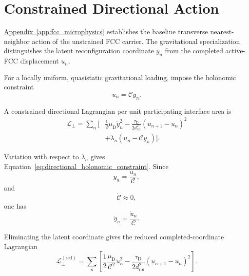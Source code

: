 \section{Constrained Directional Action}
\label{sec:grav_constrained_directional_action}

\hyperref[app:fcc_microphysics]{Appendix~\ref*{app:fcc_microphysics}} establishes the baseline transverse nearest-neighbor action of the unstrained FCC carrier. The gravitational specialization distinguishes the latent reconfiguration coordinate $y_{n}$ from the completed active-FCC displacement $u_{n}$.

For a locally uniform, quasistatic gravitational loading, impose the holonomic constraint
\begin{equation}
    u_{n} = \mathcal{C}y_{n}.
    \label{eq:directional_holonomic_constraint}
\end{equation}

A constrained directional Lagrangian per unit participating interface area is
\begin{equation}
\begin{aligned}
    \mathcal{L}_{\perp} = \sum_{n} \Bigg[ & \frac{1}{2}\mu_{\mathrm{D}}\dot{y}_{n}^2 - \frac{\tau_{\mathrm{D}}}{2d_{\mathrm{nn}}^2} \left( u_{n+1}-u_{n} \right)^2 \\
    & + \lambda_{n} \left( u_{n}-\mathcal{C}y_{n} \right) \Bigg].
    \label{eq:constrained_directional_lagrangian}
\end{aligned}
\end{equation}

Variation with respect to $\lambda_{n}$ gives Equation~\eqref{eq:directional_holonomic_constraint}. Since
\begin{equation}
    y_{n} = \frac{u_{n}}{\mathcal{C}},
\end{equation}
and
\begin{equation}
    \dot{\mathcal{C}} \approx 0,
\end{equation}
one has
\begin{equation}
    \dot{y}_{n} = \frac{\dot{u}_{n}}{\mathcal{C}}.
\end{equation}

Eliminating the latent coordinate gives the reduced completed-coordinate Lagrangian
\begin{equation}
    \mathcal{L}_{\perp}^{(\mathrm{red})} = \sum_{n} \left[ \frac{1}{2} \frac{\mu_{\mathrm{D}}}{\mathcal{C}^2} \dot{u}_{n}^2 - \frac{\tau_{\mathrm{D}}}{2d_{\mathrm{nn}}^2} \left( u_{n+1}-u_{n} \right)^2 \right].
    \label{eq:reduced_directional_lagrangian}
\end{equation}

